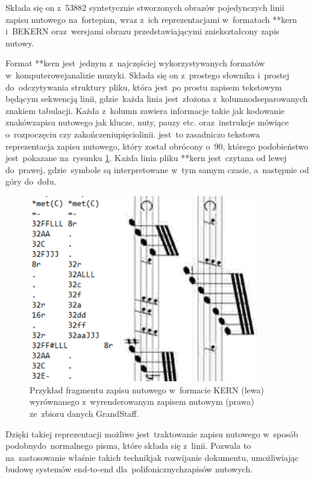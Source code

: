 Składa się on z~53882 syntetycznie stworzonych obrazów pojedynczych linii zapisu nutowego na~fortepian, wraz z~ich reprezentacjami w~formatach **kern i~BEKERN oraz~wersjami obrazu przedstawiającymi zniekształcony zapis nutowy.

Format **kern jest~jednym z~najczęściej wykorzystywanych formatów w~komputerowej\linebreak analizie muzyki. Składa się on z~prostego słownika i~prostej do~odczytywania struktury pliku, która jest~po prostu zapisem tekstowym będącym sekwencją linii, gdzie~każda linia jest~złożona z~kolumn\linebreak odseparowanych znakiem tabulacji. Każda z~kolumn zawiera informacje takie jak kodowanie znaków\linebreak zapisu nutowego jak klucze, nuty, pauzy etc. oraz~instrukcje mówiące o~rozpoczęciu czy zakończeniu\linebreak pięciolinii. jest~to zasadniczo tekstowa reprezentacja zapisu nutowego, który został obrócony o~90\degree, którego podobieństwo jest~pokazane na~rysunku \ref{fig:kern-score}. Każda linia pliku **kern jest~czytana od lewej do~prawej, gdzie~symbole są interpretowane w~tym samym czasie, a~następnie od góry do~dołu.

\begin{figure}[htb]
	\centering
	\includegraphics[width=10cm]{images/kern-nuty.jpg}
	\caption{Przykład fragmentu zapisu nutowego w~formacie KERN (lewa) wyrównanego z~wyrenderowanym zapisem nutowym (prawa) ze~zbioru danych GrandStaff.}
	\label{fig:kern-score}
\end{figure}

Dzięki takiej reprezentacji możliwe jest~traktowanie zapisu nutowego w~sposób podobny\linebreak do~normalnego pisma, które składa się z~linii. Pozwala to na~zastosowanie właśnie takich technik\linebreak jak rozwijanie dokumentu\cite{Coquenet2021}, umożliwiając budowę systemów end-to-end dla~polifonicznych\linebreak zapisów nutowych.

